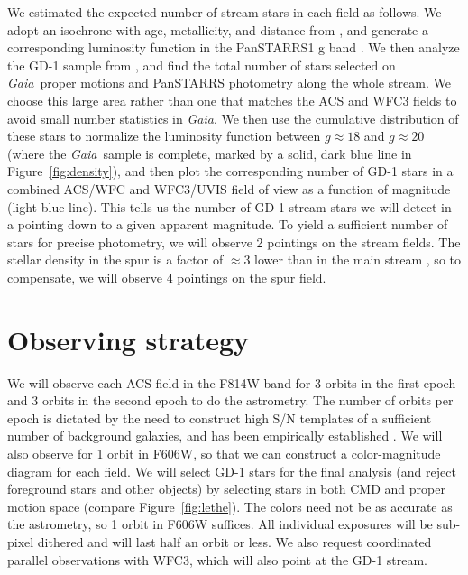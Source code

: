 \documentclass[12pt]{article}
\newcommand{\gaia}{\textsl{Gaia}}
\begin{document}
We estimated the expected number of stream stars in each field as follows.
We adopt an isochrone with age, metallicity, and distance from \textcite{koposov2010}, and generate a corresponding luminosity function in the PanSTARRS1 g band \parencite[Figure~\ref{fig:density},][]{dotter2008}.
We then analyze the GD-1 sample from \textcite{pwb2018}, and find the total number of stars selected on \gaia\ proper motions and PanSTARRS photometry along the whole stream.
We choose this large area rather than one that matches the ACS and WFC3 fields to avoid small number statistics in \gaia.
We then use the cumulative distribution of these stars to normalize the luminosity function between $g\approx18$ and $g\approx20$ (where the \gaia\ sample is complete, marked by a solid, dark blue line in Figure~\ref{fig:density}), and then plot the corresponding number of GD-1 stars in a combined ACS/WFC and WFC3/UVIS field of view as a function of magnitude (light blue line).
This tells us the number of GD-1 stream stars we will detect in a pointing down to a given apparent magnitude.
To yield a sufficient number of stars for precise photometry, we will observe 2 pointings on the stream fields.
The stellar density in the spur is a factor of $\approx3$ lower than in the main stream \parencite[compare Figure~5 in][]{pwb2018}, so to compensate, we will observe 4 pointings on the spur field.

\section*{Observing strategy}
We will observe each ACS field in the F814W band for 3 orbits in the first epoch and 3 orbits in the second epoch to do the astrometry.
The number of orbits per epoch is dictated by the need to construct high S/N templates of a sufficient number of background galaxies, and has been empirically established \parencite[e.g.,][]{sohn2012}. 
We will also observe for 1 orbit in F606W, so that we can construct a color-magnitude diagram for each field.
We will select GD-1 stars for the final analysis (and reject foreground stars and other objects) by selecting stars in both CMD and proper motion space (compare Figure~\ref{fig:lethe}).
The colors need not be as accurate as the astrometry, so 1 orbit in F606W suffices.
All individual exposures will be sub-pixel dithered and will last half an orbit or less.
We also request coordinated parallel observations with WFC3, which will also point at the GD-1 stream.
\end{document}
